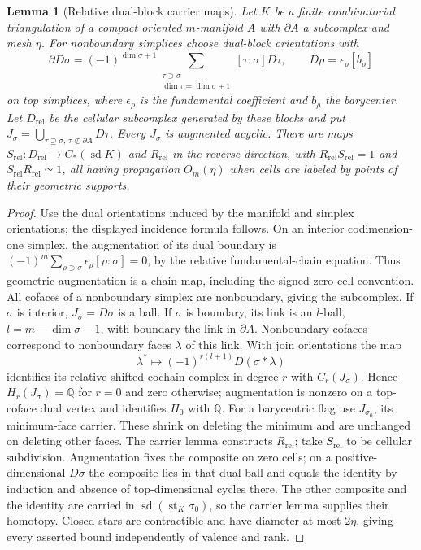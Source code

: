 \documentclass[11pt]{amsart}
\numberwithin{equation}{section}
\newtheorem{lemma}[lemma]{Lemma}
\theoremstyle{definition}
\theoremstyle{remark}
\newcommand{\Q}{\mathbb Q}
\begin{document}
\begin{lemma}[Relative dual-block carrier maps]
\label{lem:relative-block-carriers}
Let $K$ be a finite combinatorial triangulation of a compact oriented
$m$-manifold $A$ with
$\partial A$ a subcomplex and mesh $\eta$.  For nonboundary simplices
choose dual-block orientations with
\[
\partial D\sigma=(-1)^{\dim\sigma+1}
\sum_{\substack{\tau\supset\sigma\\\dim\tau=\dim\sigma+1}}
[\tau:\sigma]D\tau,\qquad D\rho=\epsilon_\rho[b_\rho]
\]
on top simplices, where $\epsilon_\rho$ is the fundamental coefficient
and $b_\rho$ the barycenter.
Let $D_{\mathrm{rel}}$ be the cellular subcomplex generated by these
blocks and put $J_\sigma=\bigcup_{\tau\supseteq\sigma,\,
\tau\not\subset\partial A}D\tau$.  Every $J_\sigma$ is augmented acyclic.
There are maps $S_{\mathrm{rel}}:D_{\mathrm{rel}}\to C_*(\operatorname{sd}K)$
and $R_{\mathrm{rel}}$ in the reverse direction, with
$R_{\mathrm{rel}}S_{\mathrm{rel}}=1$ and
$S_{\mathrm{rel}}R_{\mathrm{rel}}\simeq1$, all having propagation
$O_m(\eta)$ when cells are labeled by points of their geometric supports.
\end{lemma}
\begin{proof}
Use the dual orientations induced by the manifold and simplex orientations;
the displayed incidence formula follows.  On an interior codimension-one
simplex, the augmentation of its dual boundary is
$(-1)^m\sum_{\rho\supset\sigma}\epsilon_\rho[\rho:\sigma]=0$,
by the relative fundamental-chain equation.  Thus geometric augmentation
is a chain map, including the signed zero-cell convention.
All cofaces of a nonboundary simplex are nonboundary, giving the subcomplex.
If $\sigma$ is interior, $J_\sigma=D\sigma$ is a ball.  If $\sigma$ is
boundary, its link is an $l$-ball, $l=m-\dim\sigma-1$, with boundary the
link in $\partial A$.  Nonboundary cofaces correspond to nonboundary
faces $\lambda$ of this link.  With join orientations the map
\[
\lambda^*\longmapsto(-1)^{r(l+1)}D(\sigma*\lambda)
\]
identifies its relative shifted cochain complex in degree $r$ with
$C_r(J_\sigma)$.  Hence $H_r(J_\sigma)=\Q$ for $r=0$ and zero otherwise;
augmentation is nonzero on a top-coface dual vertex and identifies $H_0$
with $\Q$.
For a barycentric flag use $J_{\sigma_0}$, its minimum-face carrier.
These shrink on deleting the minimum and are unchanged on deleting other
faces.  The carrier lemma constructs $R_{\mathrm{rel}}$; take
$S_{\mathrm{rel}}$ to be cellular subdivision.  Augmentation fixes the
composite on zero cells; on a positive-dimensional $D\sigma$ the composite
lies in that dual ball and equals the identity by induction and absence
of top-dimensional cycles there.  The other composite
and the identity are carried in $\operatorname{sd}(\operatorname{st}_K
\sigma_0)$, so the carrier lemma supplies their homotopy.
Closed stars are contractible and have diameter at most $2\eta$,
giving every asserted bound independently of valence and rank.
\end{proof}
\end{document}
